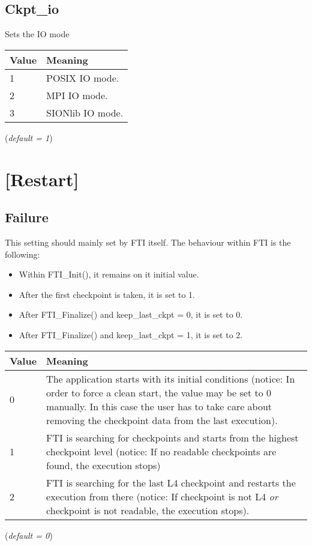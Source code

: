 \documentclass{refrep}
\begin{document}
\subsection{Ckpt\_io}\label{subsec:ckptio}
Sets the IO mode
\begin{center}
\begin{tabular}[h!]{|p{}|p{}|}
\hline
\textbf{Value} & \textbf{Meaning} \\ \hline
1 & POSIX IO mode.  \\ \hline
2 & MPI IO mode. \\ \hline
3 & SIONlib IO mode.  \\ \hline
\end{tabular}
\end{center}
(\textit{default = 1})
\section{[Restart]}\label{sec:restart}
\subsection{Failure}\label{subsec:failure}
This setting should mainly set by FTI itself. The behaviour within FTI is the following:
\begin{itemize}
\item Within {\asciifamily FTI\_Init()}, it remains on it initial value.
\item After the first checkpoint is taken, it is set to 1.
\item After {\asciifamily FTI\_Finalize()} and keep\_last\_ckpt = 0, it is set to 0.
\item After {\asciifamily FTI\_Finalize()} and keep\_last\_ckpt = 1, it is set to 2.
\end{itemize}
\begin{center}
\begin{tabular}[h!]{|p{}|p{}|}
\hline
\textbf{Value} & \textbf{Meaning} \\ \hline
0 & The application starts with its initial conditions (notice: In order to force a clean start, the value may be set to 0 manually. In this case the user has to take care about removing the checkpoint data from the last execution).  \\ \hline
1 & FTI is searching for checkpoints and starts from the highest checkpoint level (notice: If no readable checkpoints are found, the execution stops) \\ \hline
2 & FTI is searching for the last L4 checkpoint and restarts the execution from there (notice: If checkpoint is not L4 \emph{or} checkpoint is not readable, the execution stops).  \\ \hline
\end{tabular}
\end{center}
(\textit{default = 0})
\end{document}
